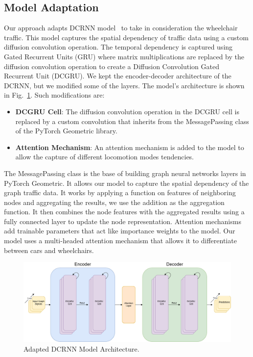 \subsection{Model Adaptation}\label{subsec:model-adaptation}
Our approach adapts DCRNN model~\cite{DCRNN} to take in consideration the wheelchair traffic.
This model captures the spatial dependency of traffic data using a custom diffusion convolution operation.
The temporal dependency is captured using Gated Recurrent Units (GRU) where matrix multiplications are replaced by
the diffusion convolution operation to create a Diffusion Convolution Gated Recurrent Unit (DCGRU).
We kept the encoder-decoder architecture of the DCRNN, but we modified some of the layers.
The model's architecture is shown in Fig.~\ref{fig:model}.
Such modifications are:

\begin{itemize}
    \item \textbf{DCGRU Cell}:
    The diffusion convolution operation in the DCGRU cell is replaced by a custom convolution that inherits from the
    MessagePassing class of the PyTorch Geometric library.
    \item \textbf{Attention Mechanism}:
    An attention mechanism is added to the model to allow the capture of different locomotion modes tendencies.
\end{itemize}
\vspace{1em}

The MessagePassing class is the base of building graph neural networks layers in PyTorch Geometric.
It allows our model to capture the spatial dependency of the graph traffic data.
It works by applying a function on features of neighboring nodes and aggregating the results, we use the addition as the
aggregation function.
It then combines the node features with the aggregated results using a fully connected layer to update the node
representation.
Attention mechanisms add trainable parameters that act like importance weights to the model.
Our model uses a multi-headed attention mechanism that allows it to differentiate between cars and wheelchairs.
\vspace{1em}

\begin{figure}[htbp]
    \centering
    \includegraphics[width=1\textwidth]{images/model}
    \caption{
        Adapted DCRNN Model Architecture.
    }
    \label{fig:model}
\end{figure}

